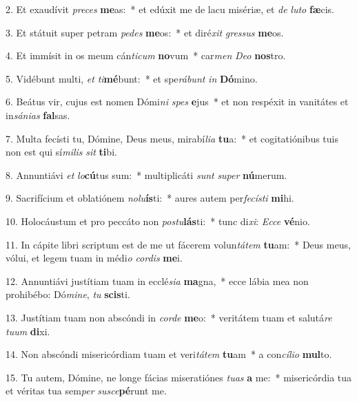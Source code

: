 2. Et exaudívit \textit{pre}\textit{ces} \textbf{me}as:~*  et edúxit me de lacu misériæ, et \textit{de} \textit{lu}\textit{to} \textbf{fæ}cis.\

3. Et státuit super petram \textit{pe}\textit{des} \textbf{me}os:~*  et diré\textit{xit} \textit{gres}\textit{sus} \textbf{me}os.\

4. Et immísit in os meum cán\textit{ti}\textit{cum} \textbf{no}vum~*  car\textit{men} \textit{De}\textit{o} \textbf{nos}tro.\

5. Vidébunt multi, \textit{et} \textit{ti}\textbf{mé}bunt:~*  et spe\textit{rá}\textit{bunt} \textit{in} \textbf{Dó}mino.\

6. Beátus vir, cujus est nomen Dómi\textit{ni} \textit{spes} \textbf{e}jus~*  et non respéxit in vanitátes et in\textit{sá}\textit{ni}\textit{as} \textbf{fal}sas.\

7. Multa fecísti tu, Dómine, Deus meus, mirabí\textit{li}\textit{a} \textbf{tu}a:~*  et cogitatiónibus tuis non est qui sí\textit{mi}\textit{lis} \textit{sit} \textbf{ti}bi.\

8. Annuntiávi \textit{et} \textit{lo}\textbf{cú}tus sum:~*  multiplicáti \textit{sunt} \textit{su}\textit{per} \textbf{nú}merum.\

9. Sacrifícium et oblatiónem \textit{no}\textit{lu}\textbf{ís}ti:~*  aures autem per\textit{fe}\textit{cís}\textit{ti} \textbf{mi}hi.\

10. Holocáustum et pro peccáto non \textit{pos}\textit{tu}\textbf{lás}ti:~*  tunc di\textit{xi}: \textit{Ec}\textit{ce} \textbf{vé}nio.\

11. In cápite libri scriptum est de me ut fácerem volun\textit{tá}\textit{tem} \textbf{tu}am:~*  Deus meus, vólui, et legem tuam in médi\textit{o} \textit{cor}\textit{dis} \textbf{me}i.\

12. Annuntiávi justítiam tuam in ecclé\textit{si}\textit{a} \textbf{ma}gna,~*  ecce lábia mea non prohibébo: Dó\textit{mi}\textit{ne}, \textit{tu} \textbf{scis}ti.\

13. Justítiam tuam non abscóndi in \textit{cor}\textit{de} \textbf{me}o:~*  veritátem tuam et salutá\textit{re} \textit{tu}\textit{um} \textbf{di}xi.\

14. Non abscóndi misericórdiam tuam et veri\textit{tá}\textit{tem} \textbf{tu}am~*  a con\textit{cí}\textit{li}\textit{o} \textbf{mul}to.\

15. Tu autem, Dómine, ne longe fácias miseratiónes \textit{tu}\textit{as} \textbf{a} me:~*  misericórdia tua et véritas tua sem\textit{per} \textit{su}\textit{sce}\textbf{pé}runt me.\

